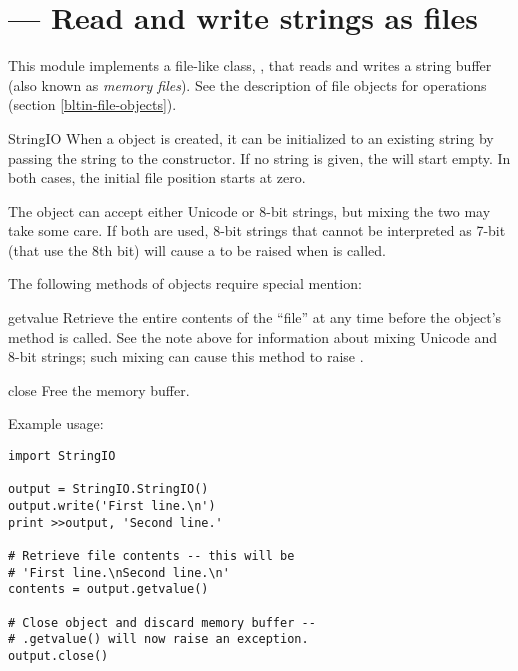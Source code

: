 \section{ ---
         Read and write strings as files}



This module implements a file-like class, ,
that reads and writes a string buffer (also known as \emph{memory
files}).  See the description of file objects for operations (section
\ref{bltin-file-objects}).

\begin{classdesc}{StringIO}{}
When a  object is created, it can be initialized
to an existing string by passing the string to the constructor.
If no string is given, the  will start empty.
In both cases, the initial file position starts at zero.

The  object can accept either Unicode or 8-bit
strings, but mixing the two may take some care.  If both are used,
8-bit strings that cannot be interpreted as 7-bit \ASCII{} (that
use the 8th bit) will cause a  to be raised
when  is called.
\end{classdesc}

The following methods of  objects require special
mention:

\begin{methoddesc}{getvalue}{}
Retrieve the entire contents of the ``file'' at any time before the
 object's  method is called.  See the
note above for information about mixing Unicode and 8-bit strings;
such mixing can cause this method to raise .
\end{methoddesc}

\begin{methoddesc}{close}{}
Free the memory buffer.
\end{methoddesc}

Example usage:

\begin{verbatim}
import StringIO

output = StringIO.StringIO()
output.write('First line.\n')
print >>output, 'Second line.'

# Retrieve file contents -- this will be
# 'First line.\nSecond line.\n'
contents = output.getvalue()

# Close object and discard memory buffer -- 
# .getvalue() will now raise an exception.
output.close()
\end{verbatim}


